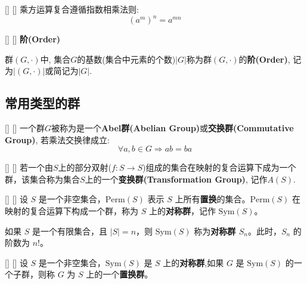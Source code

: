 \documentclass[UTF8]{ctexart}
\begin{document}
		\begin{ppt}
            []
            {}
            []
            []
			乘方运算复合遵循指数相乘法则: 
			\[(a^{m})^{n}=a^{mn}\]
		\end{ppt}

		\begin{dfn}
            []
            {}
            []
            []
			\textbf{阶(Order)}

			群$(G,\cdot)$中, 集合$G$的基数(集合中元素的个数)$|G|$称为群$(G,\cdot)$的\textbf{阶(Order)}, 记为$|(G,\cdot)|$或简记为$|G|$. 
		\end{dfn}
	
	\subsection{常用类型的群}
		
		\begin{xmp}
            []
            {}
            []
            []
			一个群$G$被称为是一个\textbf{Abel群(Abelian Group)}或\textbf{交换群(Commutative Group)}, 若乘法交换律成立: 
			\[\forall a,b\in G\Longrightarrow ab=ba\]
		\end{xmp}
			
		\begin{xmp}
            []
            {}
            []
            []
			若一个由$S$上的部分双射($f:S\to S$)组成的集合在映射的复合运算下成为一个群，该集合称为集合$S$上的一个\textbf{变换群(Transformation Group)}, 记作$A(S)$. 
		\end{xmp}

		\begin{xmp}
            []
            {}
            []
            []
			设 \( S \) 是一个非空集合，\( \text{Perm}(S) \) 表示 \( S \) 上所有\textbf{置换}的集合。\( \text{Perm}(S) \) 在映射的复合运算下构成一个群，称为 \( S \) 上的\textbf{对称群}，记作 \( \text{Sym}(S) \)。

			如果 \( S \) 是一个有限集合，且 \( |S| = n \)，则 \( \text{Sym}(S) \) 称为\textbf{对称群 \( S_n \)}。此时，\( S_n \) 的阶数为 \( n! \)。
		\end{xmp}
		
		\begin{xmp}
            []
            {}
            []
            []
			设 \( S \) 是一个非空集合，\( \text{Sym}(S) \) 是 \( S \) 上的\textbf{对称群},如果 \( G \) 是 \( \text{Sym}(S) \) 的一个子群，则称 \( G \) 为 \( S \) 上的一个\textbf{置换群}。
		\end{xmp}
\end{document}
